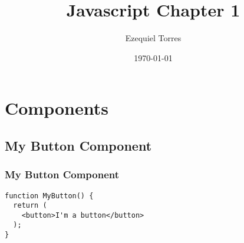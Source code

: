 \documentclass{beamer}
\begin{document}
\title{Javascript Chapter 1}
\author{Ezequiel Torres}
\date{\today}
\frame{\titlepage}

\section{Components}

\begin{frame}[fragile]
\subsection{My Button Component}
\frametitle{My Button Component}
\begin{lstlisting}
function MyButton() {
  return (
    <button>I'm a button</button>
  );
}
\end{lstlisting}
\end{frame}
\end{document}
